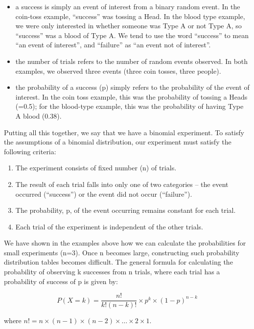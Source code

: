 \documentclass[
  a4paper,
]{memoir}
\providecommand{\tightlist}{%
  \setlength{\itemsep}{0pt}\setlength{\parskip}{0pt}}
\begin{document}
\begin{itemize}
\tightlist
\item
  a success is simply an event of interest from a binary random event.
  In the coin-toss example, ``success'' was tossing a Head. In the blood
  type example, we were only interested in whether someone was Type A or
  not Type A, so ``success'' was a blood of Type A. We tend to use the
  word ``success'' to mean ``an event of interest'', and ``failure'' as
  ``an event not of interest''.
\item
  the number of trials refers to the number of random events observed.
  In both examples, we observed three events (three coin tosses, three
  people).
\item
  the probability of a success (p) simply refers to the probability of
  the event of interest. In the coin toss example, this was the
  probability of tossing a Heads (=0.5); for the blood-type example,
  this was the probability of having Type A blood (0.38).
\end{itemize}

Putting all this together, we say that we have a binomial experiment. To
satisfy the assumptions of a binomial distribution, our experiment must
satisfy the following criteria:

\begin{enumerate}
\def\labelenumi{\arabic{enumi}.}
\tightlist
\item
  The experiment consists of fixed number (n) of trials.
\item
  The result of each trial falls into only one of two categories -- the
  event occurred (``success'') or the event did not occur (``failure'').
\item
  The probability, p, of the event occurring remains constant for each
  trial.
\item
  Each trial of the experiment is independent of the other trials.
\end{enumerate}

We have shown in the examples above how we can calculate the
probabilities for small experiments (n=3). Once n becomes large,
constructing such probability distribution tables becomes difficult. The
general formula for calculating the probability of observing k successes
from n trials, where each trial has a probability of success of p is
given by:

\[ P(X=k) = \frac{n!}{k! (n-k)!} \times p^k \times (1-p)^{n-k} \]

where
\(n! = n \times (n-1) \times (n-2) \times \dots \times 2 \times 1\).
\end{document}

